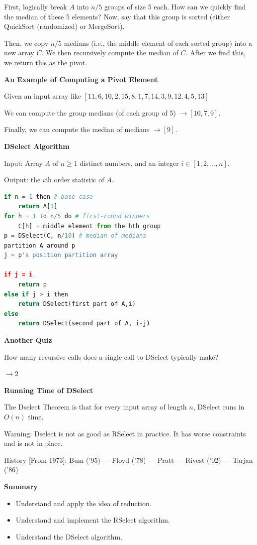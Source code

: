 \documentclass[11pt]{article}
\newcommand{\boldsec}[1]{
    \vspace{11pt}
    \textbf{#1}
    \vspace{11pt}
}
\begin{document}
First, logically break $A$ into $n/5$ groups of size 5 each. How can we quickly find the median of these 5 elements? Now, say that this group is sorted (either QuickSort (randomized) or MergeSort). 

Then, we copy $n/5$ medians (i.e., the middle element of each sorted group) into a new array $C$. We then recursively compute the median of $C$. After we find this, we return this as the pivot.

\boldsec{An Example of Computing a Pivot Element}

Given an input array like $[11,6,10,2,15,8,1,7,14,3,9,12,4,5,13]$

We can compute the group medians (of each group of 5) $\to [10,7,9]$.

Finally, we can compute the median of medians $\to [9]$.


\boldsec{DSelect Algorithm}

Input: Array $A$ of $n \geq 1$ distinct numbers, and an integer $i \in [1,2,\dots,n]$.

Output: the $i$th order statistic of $A$.

\vspace{11pt}
\begin{lstlisting}[language=python, breaklines=true]
if n = 1 then # base case
    return A[1] 
for h = 1 to n/5 do # first-round winners
    C[h] = middle element from the hth group
p = DSelect(C, n/10) # median of medians
partition A around p
j = p's position partition array

if j = i
    return p
else if j > i then
    return DSelect(first part of A,i)
else
    return DSelect(second part of A, i-j)
\end{lstlisting}

\boldsec{Another Quiz}

How many recursive calls does a single call to DSelect typically make?

$\to 2$

\boldsec{Running Time of DSelect}

The Dselect Theorem is that for every input array of length $n$, DSelect runs in $O(n)$ time.

Warning: Dselect is not as good as RSelect in practice. It has worse constraints and is not in place.

History [From 1973]: Bum ('95) --- Floyd ('78) --- Pratt --- Rivest ('02) --- Tarjan ('86)

\boldsec{Summary}

\begin{itemize}
    \item Understand and apply the idea of reduction.
    \item Understand and implement the RSelect algorithm.
    \item Understand the DSelect algorithm.
\end{itemize}
\end{document}
